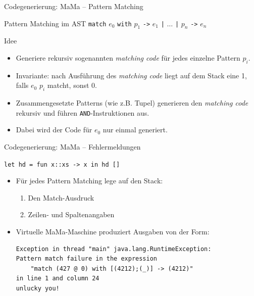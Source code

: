 \documentclass[hyperref={pdfpagelabels=false}]{beamer}
\begin{document}
\begin{frame}{Codegenerierung: MaMa -- Pattern Matching}
  \begin{block}{Pattern Matching im AST}
  	\texttt{match} $e_0$ \texttt{with} $p_1$ \texttt{->} $e_1$ \texttt{|} $\ldots$ \texttt{|} $p_n$ \texttt{->} $e_n$
  \end{block}
  \begin{block}{Idee}
    \begin{itemize}
  	\item Generiere rekursiv sogenannten \emph{matching code} für jedes einzelne Pattern $p_i$.
  	\item Invariante: nach Ausführung des \emph{matching code} liegt auf dem Stack eine 1, falls $e_0$ $p_i$ matcht, sonst 0.
  	\item Zusammengesetzte Patterns (wie z.B. Tupel) generieren den \emph{matching code} rekursiv und führen \texttt{AND}-Instruktionen aus.  
  	\item Dabei wird der Code für $e_0$ nur einmal generiert.
  	\end{itemize}
  \end{block}
\end{frame}

\begin{frame}[fragile]{Codegenerierung: MaMa -- Fehlermeldungen}
\begin{block}{\texttt{let hd = fun x::xs -> x in hd []}}
\begin{itemize}
\item Für jedes Pattern Matching lege auf den Stack:
\begin{enumerate}
\item Den Match-Ausdruck
\item Zeilen- und Spaltenangaben
\end{enumerate}
\item Virtuelle MaMa-Maschine produziert Ausgaben von der Form:
\begin{small}
\begin{verbatim}
Exception in thread "main" java.lang.RuntimeException: 
Pattern match failure in the expression
	"match (427 @ 0) with [(4212);(_)] -> (4212)"
in line 1 and column 24
unlucky you!
\end{verbatim}
\end{small}
\end{itemize}
\end{block}
\end{frame}
\end{document}
